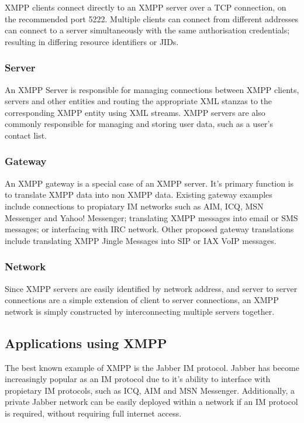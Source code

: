 XMPP clients connect directly to an XMPP server over a TCP connection,
on the recommended port 5222. Multiple clients can connect from 
different addresses can connect to a server simultaneously with the same 
authorisation credentials; resulting in differing resource identifiers
or JIDs.

\subsubsection{Server}

An XMPP Server is responsible for managing connections between XMPP
clients, servers and other entities and routing the appropriate XML stanzas
to the corresponding XMPP entity using XML streams. XMPP servers are
also commonly responsible for managing and storing user data, such as a
user's contact list.

\subsubsection{Gateway}

An XMPP gateway is a special case of an XMPP server. It's primary
function is to translate XMPP data into non XMPP data. Existing gateway 
examples include connections to propiatary IM networks such as AIM, ICQ,
MSN Messenger and Yahoo! Messenger; translating XMPP messages into email 
or SMS messages; or interfacing with IRC network. Other proposed gateway
translations include translating XMPP Jingle Messages into SIP or IAX
VoIP messages.

\subsubsection{Network}

Since XMPP servers are easily identified by network address, and server
to server connections are a simple extension of client to server
connections, an XMPP network is simply constructed by interconnecting
multiple servers together.

\subsection{Applications using XMPP}

The best known example of XMPP is the Jabber IM protocol. Jabber has
become increasingly popular as an IM protocol due to it's ability to
interface with propietary IM protocols, such as ICQ, AIM and MSN
Messenger. Additionally, a private Jabber network can be easily 
deployed within a network if an IM protocol is required, without 
requiring full internet access. 


